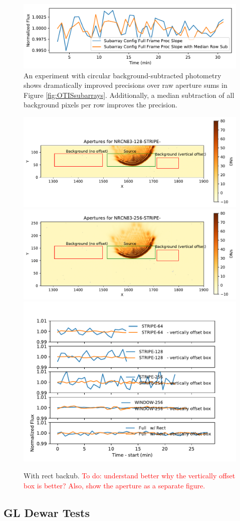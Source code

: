 \documentclass{aastex62}
\begin{document}
{\begin{figure}[!hbtp]
\centering
\includegraphics[width=.5\columnwidth]{fullframe_background_sub_compare_tser_tools.pdf}
\caption{An experiment with circular background-subtracted photometry shows dramatically improved precisions over raw aperture sums in Figure \ref{fig:OTISsubarrays}.
Additionally, a median subtraction of all background pixels per row improves the precision.}\label{fig:OTISSubConfigCircularAp}
\end{figure}

\begin{figure}[!hbtp]
\centering
\includegraphics[width=0.48\columnwidth]{apertures_for_NRCN83-128-STRIPE-72.pdf}
\includegraphics[width=0.48\columnwidth]{apertures_for_NRCN83-256-STRIPE-72.pdf}
\includegraphics[width=.48\columnwidth]{subarray_config_tser_backsub_rect.pdf}
\caption{With rect backub.
\textcolor{red}{To do: understand better why the vertically offset box is better? Also, show the aperture as a separate figure.}}\label{fig:OTISRectBacksub}
\end{figure}

\subsection{GL Dewar Tests}

}
\end{document}
